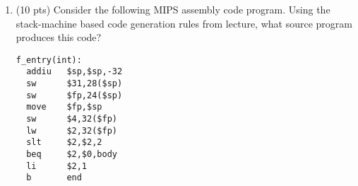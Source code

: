 \documentclass[10pt]{article}
\newcommand{\ossimple}[6]{#1,#2,#3\vdash #4 : #5,#6}
\newcommand{\osrule}[8]{\frac{#7}{\ossimple{#1}{#2}{#3}{#4}{#5}{#6}}\eqno
  \mbox{#8}}
\begin{document}
\begin{enumerate}
\begin{itemize}
\item If the loop body never executes (i.e., the condition is false the
first time it is evaluated), then the result of the {\tt while} expression
is {\tt void}.

\end{itemize}

For example, consider the following expression:

\begin{center}
{\tt while (x < 10) loop x <- x+1 pool}
\end{center}

The result of this expression would be 10 if {\tt x} $<$ 10 or {\tt void}
if {\tt x} $\geq$ 10.

Write new operational rules for the {\tt while} construct that formalize
these alternative semantics.


$$
\osrule{so}{S_1} E {\mbox{while }e_1\mbox{ loop } e_2\mbox{ pool}}{void}{S_{2}}
	{\begin{array}{l}
	\ossimple{so}{S_1}{E}{e_1}{Bool(false)}{S_2}\\
	 \end{array}}{[Loop-False]}
$$

$$
\osrule{so}{S_1} E {\mbox{while }e_1\mbox{ loop } e_2\mbox{ pool}}{v_2}{S_{4}}
	{\begin{array}{l}
	\ossimple{so}{S_1}{E}{e_1}{Bool(true)}{S_2}\\
	\ossimple{so}{S_2}{E}{e_2}{v_2}{S_3}\\
	\ossimple{so}{S_3}{E}{e_1}{Bool(false)}{S_4}\\
	 \end{array}}{[Loop-True-Last]}
$$

$$
\osrule{so}{S_1} E {\mbox{while }e_1\mbox{ loop } e_2\mbox{ pool}}{v_3}{S_{5}}
	{\begin{array}{l}
	\ossimple{so}{S_1}{E}{e_1}{Bool(true)}{S_2}\\
	\ossimple{so}{S_2}{E}{e_2}{v_2}{S_3}\\
	\ossimple{so}{S_3}{E}{e_1}{Bool(true)}{S_4}\\
	\ossimple{so}{S_3}{E}{\mbox{while }e_1\mbox{ loop } e_2\mbox{ pool}}{v_3}{S_5}\\
	 \end{array}}{[Loop-True-Not-Last]}
$$

\item (10 pts) Consider the following MIPS assembly code program.  Using the
stack-machine based code generation rules from lecture, what source program produces this
code?
\begin{verbatim}
f_entry(int):
  addiu   $sp,$sp,-32
  sw      $31,28($sp)
  sw      $fp,24($sp)
  move    $fp,$sp
  sw      $4,32($fp)
  lw      $2,32($fp)
  slt     $2,$2,2
  beq     $2,$0,body
  li      $2,1                 
  b       end


\end{verbatim}
\end{enumerate}
\end{document}
